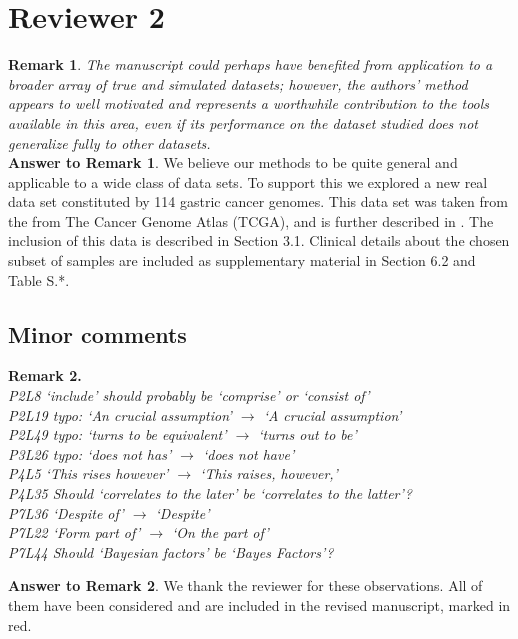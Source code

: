 \documentclass[11pt]{amsart}
\begin{document}
\section*{Reviewer 2}
\textbf{Remark 1}. \emph{
The manuscript could perhaps have benefited from application to a
broader array of true and simulated datasets; however, the authors’
method appears to well motivated and represents a worthwhile
contribution to the tools available in this area, even if its
performance on the dataset studied does not generalize fully to
other datasets.}
\\

\textbf{Answer to Remark 1}. We believe our methods to be quite general and applicable to a wide class of data sets. To support this we explored  a new real data set constituted by 114 gastric cancer genomes. This data set was taken from the from The Cancer Genome Atlas (TCGA), and is further described in \cite{gastrico}. The inclusion of this data is described in Section 3.1. Clinical details about the chosen subset of samples are included as supplementary material in Section 6.2 and Table S.*.
\\


\subsection*{Minor comments}
\textbf{Remark 2.}\\
\emph{
P2L8 `include' should probably be `comprise' or `consist of'\\
P2L19 typo: `An crucial assumption' $\to$ `A crucial assumption'\\
P2L49 typo: `turns to be equivalent' $\to$ `turns out to be'\\
P3L26 typo: `does not has' $\to$ `does not have'\\
P4L5 `This rises however' $\to$ `This raises, however,'\\
P4L35 Should `correlates to the later' be `correlates to the latter'?\\
P7L36 `Despite of' $\to$ `Despite'\\
P7L22 `Form part of' $\to$ `On the part of'\\
P7L44 Should `Bayesian factors' be `Bayes Factors'?\\
}


\textbf{Answer to Remark 2}. We thank the reviewer for these observations. All of them have been considered and are included in the revised manuscript, marked in red.
\\
\end{document}
